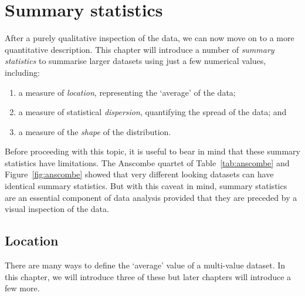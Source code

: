 \chapter{Summary statistics}
\label{ch:summary-statistics}

After a purely qualitative inspection of the data, we can now move on
to a more quantitative description. This chapter will introduce a
number of \emph{summary statistics} to summarise larger datasets using
just a few numerical values, including:

\begin{enumerate}
  \item a measure of \emph{location}, representing the `average' of
    the data;
  \item a measure of statistical \emph{dispersion}, quantifying the
    spread of the data; and
  \item a measure of the \emph{shape} of the distribution.
\end{enumerate}

Before proceeding with this topic, it is useful to bear in mind that
these summary statistics have limitations.  The Anscombe quartet of
Table~\ref{tab:anscombe} and Figure~\ref{fig:anscombe} showed that
very different looking datasets can have identical summary
statistics. But with this caveat in mind, summary statistics are an
essential component of data analysis provided that they are preceded
by a visual inspection of the data.

\section{Location}
\label{sec:location}

There are many ways to define the `average' value of a multi-value
dataset.  In this chapter, we will introduce three of these but later
chapters will introduce a few more.

